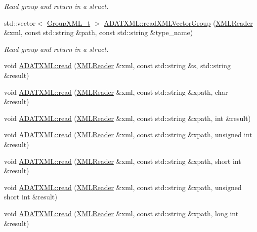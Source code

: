\begin{DoxyCompactItemize}
\begin{DoxyCompactList}\small\item\em Read group and return in a struct. \end{DoxyCompactList}\item 
std\+::vector$<$ \mbox{\hyperlink{structADATXML_1_1GroupXML__t}{Group\+X\+M\+L\+\_\+t}} $>$ \mbox{\hyperlink{group__io_ga3cd8ca33a23f0e4eafde989d168b8247}{A\+D\+A\+T\+X\+M\+L\+::read\+X\+M\+L\+Vector\+Group}} (\mbox{\hyperlink{classADATXML_1_1XMLReader}{X\+M\+L\+Reader}} \&xml, const std\+::string \&path, const std\+::string \&type\+\_\+name)
\begin{DoxyCompactList}\small\item\em Read group and return in a struct. \end{DoxyCompactList}\item 
void \mbox{\hyperlink{group__io_ga9ad99522897be390bf165bf7f963acc8}{A\+D\+A\+T\+X\+M\+L\+::read}} (\mbox{\hyperlink{classADATXML_1_1XMLReader}{X\+M\+L\+Reader}} \&xml, const std\+::string \&s, std\+::string \&result)
\item 
void \mbox{\hyperlink{group__io_ga42921d40fdc242e0dc6200a66c1eb928}{A\+D\+A\+T\+X\+M\+L\+::read}} (\mbox{\hyperlink{classADATXML_1_1XMLReader}{X\+M\+L\+Reader}} \&xml, const std\+::string \&xpath, char \&result)
\item 
void \mbox{\hyperlink{group__io_ga0e33dbc1e3ebc33bfb45ef5f1b390e45}{A\+D\+A\+T\+X\+M\+L\+::read}} (\mbox{\hyperlink{classADATXML_1_1XMLReader}{X\+M\+L\+Reader}} \&xml, const std\+::string \&xpath, int \&result)
\item 
void \mbox{\hyperlink{group__io_ga8237b5b121cf20d4d72ebe0396ad5fc7}{A\+D\+A\+T\+X\+M\+L\+::read}} (\mbox{\hyperlink{classADATXML_1_1XMLReader}{X\+M\+L\+Reader}} \&xml, const std\+::string \&xpath, unsigned int \&result)
\item 
void \mbox{\hyperlink{group__io_gac393d0005e4174339c4abaf8a008deac}{A\+D\+A\+T\+X\+M\+L\+::read}} (\mbox{\hyperlink{classADATXML_1_1XMLReader}{X\+M\+L\+Reader}} \&xml, const std\+::string \&xpath, short int \&result)
\item 
void \mbox{\hyperlink{group__io_ga8fe4b50be5b1bd3e2bfb094b7c158c06}{A\+D\+A\+T\+X\+M\+L\+::read}} (\mbox{\hyperlink{classADATXML_1_1XMLReader}{X\+M\+L\+Reader}} \&xml, const std\+::string \&xpath, unsigned short int \&result)
\item 
void \mbox{\hyperlink{group__io_gac5101b8a4f533a23a99e6ae250648a1d}{A\+D\+A\+T\+X\+M\+L\+::read}} (\mbox{\hyperlink{classADATXML_1_1XMLReader}{X\+M\+L\+Reader}} \&xml, const std\+::string \&xpath, long int \&result)

\end{DoxyCompactItemize}
